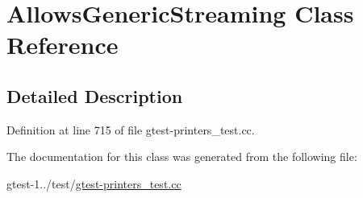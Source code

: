 \hypertarget{classtesting_1_1gtest__printers__test_1_1AllowsGenericStreaming}{\section{\-Allows\-Generic\-Streaming \-Class \-Reference}
\label{d2/d56/classtesting_1_1gtest__printers__test_1_1AllowsGenericStreaming}
}


\subsection{\-Detailed \-Description}


\-Definition at line 715 of file gtest-\/printers\-\_\-test.\-cc.



\-The documentation for this class was generated from the following file\-:\begin{DoxyCompactItemize}
\item 
gtest-\/1../test/\hyperlink{gtest-printers__test_8cc}{gtest-\/printers\-\_\-test.\-cc}\end{DoxyCompactItemize}
